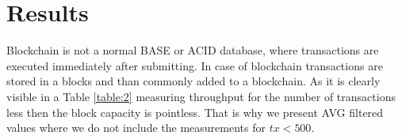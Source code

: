 \section{Results}

 Blockchain is not a normal BASE or ACID database, where transactions are executed immediately after submitting. In case of blockchain transactions are stored in a blocks and than commonly added to a blockchain.
 As it is clearly visible in a Table \ref{table:2} measuring throughput for the number of transactions less then the block capacity is pointless. That is why we present AVG filtered values where we do not include the measurements for $tx < 500$.
